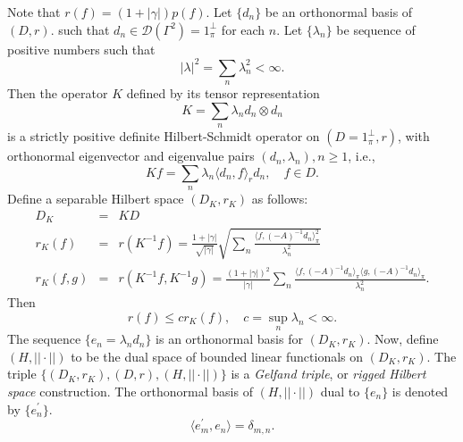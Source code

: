 \documentclass[11pt]{article}
\numberwithin{equation}{section}
\theoremstyle{definition}
\theoremstyle{remark}
\theoremstyle{definition}
\begin{document}
Note that
$r(f) = (1+|\gamma|)p(f)$.
Let $\{d_n\}$ be an orthonormal basis of $(D,r)$.
such that $d_n\in\mathcal{D}(\Gamma^2) = 1_\pi^\perp$
for each $n$. Let $\{\lambda_n\}$ be sequence of 
positive numbers such that 
\begin{equation}
|\lambda|^2 = \sum_n\lambda_n^2 <\infty.
\end{equation}
Then the operator $K$ defined by its tensor representation
\begin{equation} K = \sum_n\lambda_n d_n\otimes d_n
\end{equation}
is a strictly positive definite Hilbert-Schmidt operator on $(D=1_\pi^\perp,r)$, with orthonormal eigenvector and
eigenvalue pairs $(d_n,\lambda_n), n\ge 1$, i.e., 
\begin{equation}
Kf = \sum_n\lambda_n\langle d_n,f\rangle_rd_n,
\quad f\in D. 
\end{equation} Define a separable Hilbert
space $(D_K,r_K)$ as follows:
\begin{eqnarray}
D_K&=&KD\\
r_K(f) &=& r(K^{-1}f)=\frac{1+|\gamma|}{\sqrt{|\gamma|}}\sqrt{\sum_n\frac{\langle f,(-A)^{-1}d_n\rangle^2_\pi}{\lambda_n^2}}\\
 r_K(f,g) &=& r(K^{-1}f,K^{-1}g) =  
 \frac{(1+|\gamma|)^2}{|\gamma|}\sum_n\frac{\langle f,(-A)^{-1}d_n\rangle_\pi\langle g,(-A)^{-1}d_n\rangle_\pi}{\lambda_n^2}.
\end{eqnarray}
Then 
\begin{equation}
r(f) \le cr_K(f), \quad c = \sup_n\lambda_n <\infty.
\end{equation}
The sequence $\{e_n = \lambda_nd_n\}$ is an 
orthonormal basis for $(D_K,r_K)$. Now, define
$(H,||\cdot||)$ to be the dual space of 
bounded linear functionals on $(D_K,r_K)$.
The triple $\{(D_K,r_K),(D,r),(H,||\cdot||)\}$ is a
{\it Gelfand triple}, or 
 {\it rigged Hilbert space} construction.
 The orthonormal
basis of $(H,||\cdot||)$ dual to $\{e_n\}$ is denoted
by $\{e_n^\prime\}$. 
\begin{equation}
\langle e_m^\prime,e_n\rangle = \delta_{m,n}.
\end{equation}
\end{document}
